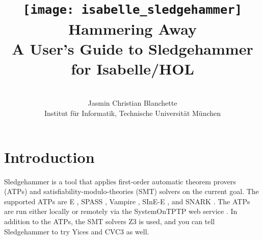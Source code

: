 \documentclass[a4paper,12pt]{article}
\begin{document}

\title{\texttt{[image: isabelle\_sledgehammer]} \\[4ex]
Hammering Away \\[\smallskipamount]
\Large A User's Guide to Sledgehammer for Isabelle/HOL}
\author{\hbox{} \\
Jasmin Christian Blanchette \\
{\normalsize Institut f\"ur Informatik, Technische Universit\"at M\"unchen} \\
\hbox{}}

\maketitle

\tableofcontents

\setlength{\parskip}{.7em plus .2em minus .1em}
\setlength{\parindent}{0pt}
\setlength{\abovedisplayskip}{\parskip}
\setlength{\abovedisplayshortskip}{.9\parskip}
\setlength{\belowdisplayskip}{\parskip}
\setlength{\belowdisplayshortskip}{.9\parskip}

\newenvironment{enum}%
    {\begin{list}{}{%
        \setlength{\topsep}{.1\parskip}%
        \setlength{\partopsep}{.1\parskip}%
        \setlength{\itemsep}{\parskip}%
        \advance\itemsep by-\parsep}}
    {\end{list}}

\def\pre{\begingroup\vskip0pt plus1ex\advance\leftskip by\leftmargin
\advance\rightskip by\leftmargin}
\def\post{\vskip0pt plus1ex\endgroup}

\def\prew{\pre\advance\rightskip by-\leftmargin}
\def\postw{\post}

\section{Introduction}
\label{introduction}

Sledgehammer is a tool that applies first-order automatic theorem provers (ATPs)
and satisfiability-modulo-theories (SMT) solvers on the current goal. The
supported ATPs are E \cite{schulz-2002}, SPASS \cite{weidenbach-et-al-2009},
Vampire \cite{riazanov-voronkov-2002}, SInE-E \cite{sine}, and SNARK
\cite{snark}. The ATPs are run either locally or remotely via the
System\-On\-TPTP web service \cite{sutcliffe-2000}. In addition to the ATPs, the
SMT solvers Z3 \cite{z3} is used, and you can tell Sledgehammer to try Yices
\cite{yices} and CVC3 \cite{cvc3} as well.
\end{document}
